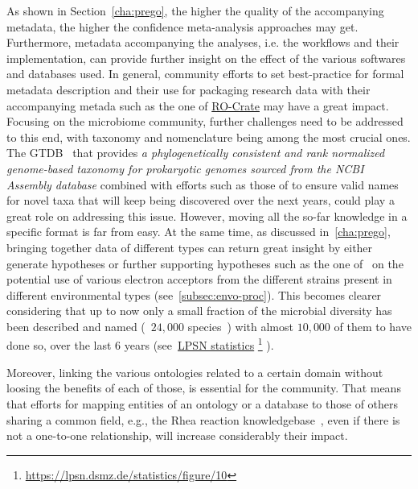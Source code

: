       As shown in Section~\ref{cha:prego}, the higher the quality of the accompanying metadata, 
      the higher the confidence meta-analysis approaches may get. 
      Furthermore, metadata accompanying the analyses, i.e. the workflows and their implementation, can provide further 
      insight on the effect of the various softwares and databases used. 
      In general, community efforts to set best-practice for formal metadata description
      and their use for packaging research data with their accompanying metada 
      such as the one of
      \href{https://www.researchobject.org/ro-crate/}{RO-Crate} may have a great impact.  
      Focusing on the microbiome community, 
      further challenges need to be addressed to this end, 
      with taxonomy and nomenclature being among the most crucial ones. 
      The GTDB~\citep{parks_gtdb_2022} that provides \textit{a phylogenetically
      consistent and rank normalized genome-based taxonomy for prokaryotic genomes sourced from the NCBI Assembly database}
      combined with efforts such as those of \citeauthor{pallen2021next} to ensure valid names for novel taxa that 
      will keep being discovered over the next years, could play a great role on addressing this issue. 
      However, moving all the so-far knowledge in a specific format is far from easy. 
      At the same time, as discussed in~\ref{cha:prego}, bringing together data of different types can return great insight 
      by either generate hypotheses or further supporting hypotheses such as the one of~\citeauthor{pavloudi2017diversity} 
      on the potential use of various electron acceptors from the different strains present in different environmental types
      (see~\ref{subsec:envo-proc}).
      This becomes clearer considering that up to now only a small fraction of the microbial diversity has been 
      described and named (~$24,000$ species~\citep{parte2020list}) with almost $10,000$ of them to have done so, over the last 6 years
      (see~\href{https://lpsn.dsmz.de/statistics/figure/10}{LPSN statistics}
      \footnote{\href{https://lpsn.dsmz.de/statistics/figure/10}{https://lpsn.dsmz.de/statistics/figure/10}}
      ). 

      Moreover, linking the various ontologies related to a certain domain without loosing the 
      benefits of each of those, is essential for the community. 
      That means that efforts for mapping entities of an ontology or a database to those of others 
      sharing a common field, e.g., the Rhea reaction knowledgebase~\citep{bansal2022rhea},
      even if there is not a one-to-one relationship, will increase considerably their impact.  

